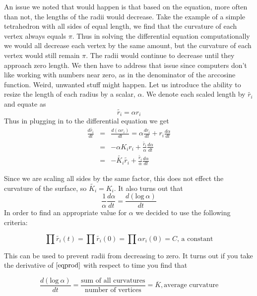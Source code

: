 \documentclass[12pt]{article}
\begin{document}
 An issue we noted that would happen is that based on the equation, more often than not, the lengths of the radii would decrease. Take the example of a simple tetrahedron with all sides of equal length, we find that the curvature of each vertex always equals $\pi$. Thus in solving the differential equation computationally we would all decrease each vertex by the same amount, but the curvature of each vertex would still remain $\pi$. The radii would continue to decrease until they approach zero length. We then have to address that issue since computers don't like working with numbers near zero, as in the denominator of the arccosine function. Weird, unwanted stuff might happen. Let us introduce the ability to resize the length of each radius by a scalar, $\alpha$. We denote each scaled length by $\tilde{r_i}$ and equate as
 \begin{equation}
 \tilde{r_i} = \alpha r_i
 \end{equation} 
 Thus in plugging in to the differential equation we get
 \begin{eqnarray}
 \label{ref1}
 \frac{d\tilde{r_i}}{dt} &=& \frac{d(\alpha r_i)}{dt} = \alpha \frac{dr_i}{dt} + r_i\frac{d\alpha}{dt}\nonumber\\
 &=& -\alpha K_ir_i + \frac{\tilde{r_i}}{\alpha}\frac{d\alpha}{dt} \nonumber \\
 &=& -\tilde{K_i}\tilde{r_i} + \frac{\tilde{r_i}}{\alpha}\frac{d\alpha}{dt}
 \end{eqnarray}
 
 Since we are scaling all sides by the same factor, this does not effect the curvature of the surface, so $\tilde{K_i} = K_i$. It also turns out that $$\displaystyle \frac{1}{\alpha} \frac{d\alpha}{dt} = \frac{d(\mbox{log}~\alpha)}{dt}$$ 
 In order to find an appropriate value for $\alpha$ we decided to use the following criteria:
 
\begin{equation}
\label{eqprod}
\prod{\tilde{r_i}(t)} = \prod{\tilde{r_i}(0)} = \prod{\alpha r_i(0)} = C\mbox{, a constant}
\end{equation}

\noindent This can be used to prevent radii from decreasing to zero. It turns out if you take the derivative of $\ref{eqprod}$ with respect to time you find that 
 
\begin{equation}
\frac{d(\mbox{log}~\alpha)}{dt} = \frac{\mbox{sum of all curvatures}}{\mbox{number of vertices}} = \overline{K}, \mbox{average curvature}
\end{equation}
 
\end{document}
